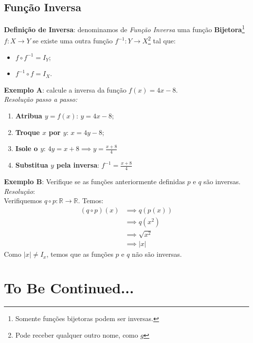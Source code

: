 \documentclass[13pt,letterpaper]{article}
\begin{document}
\subsection{Função Inversa}
\textbf{Definição de Inversa}: denominamos de \emph{Função Inversa} uma função \textbf{Bijetora}\footnote{Somente funções bijetoras podem ser inversas.} $f: X \rightarrow Y$ se existe uma outra função $f^{-1}: Y \rightarrow X$\footnote{Pode receber qualquer outro nome, como $g$} tal que:
\begin{itemize}
    \item $f \circ f^{-1} = I_Y$;
    \item $f^{-1} \circ f = I_X$.
\end{itemize}
\textbf{Exemplo A}: calcule a inversa da função $f(x) = 4x - 8$. \\
\emph{Resolução passo a passo:}
\begin{enumerate}
    \item \textbf{Atribua $y = f(x)$}: $y = 4x - 8$;
    \item \textbf{Troque $x$ por $y$}: $x = 4y - 8$;
    \item \textbf{Isole o $y$}: $4y = x + 8 \implies y = \frac{x + 8}{4}$
    \item \textbf{Substitua $y$ pela inversa}: $f^{-1} = \frac{x + 8}{4}$
\end{enumerate}
\textbf{Exemplo B}: Verifique se as funções anteriormente definidas $p$ e $q$ são inversas.
\\
\emph{Resolução}: \\
Verifiquemos $q \circ p: \mathbb{R} \rightarrow \mathbb{R}$. Temos:
    \begin{align*}
        (q \circ p)(x) &\implies q(p(x)) \\
        &\implies q(x^2) \\
        &\implies \sqrt{x^2} \\
        &\implies |x|
    \end{align*}
Como $|x| \ne I_x$, temos que as funções $p$ e $q$ não são inversas.

\section{To Be Continued...}
\end{document}
